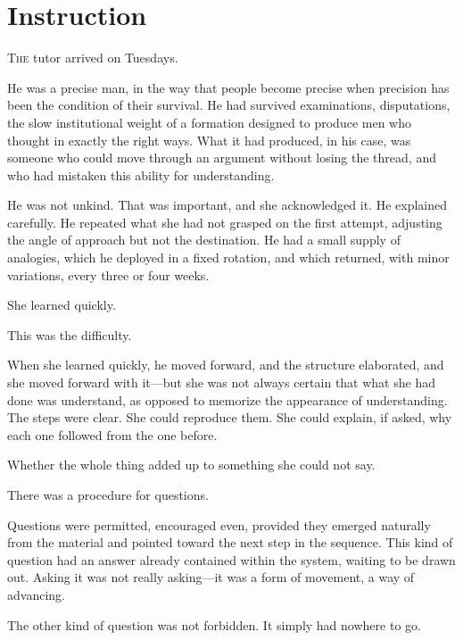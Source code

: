 
\chapter{Instruction}


\lettrine{T}{he} tutor arrived on Tuesdays.

He was a precise man, in the way that people become precise when
precision has been the condition of their survival. He had
survived examinations, disputations, the slow institutional
weight of a formation designed to produce men who thought in
exactly the right ways. What it had produced, in his case, was
someone who could move through an argument without losing the
thread, and who had mistaken this ability for understanding.

He was not unkind. That was important, and she acknowledged it.
He explained carefully. He repeated what she had not grasped on
the first attempt, adjusting the angle of approach but not the
destination. He had a small supply of analogies, which he
deployed in a fixed rotation, and which returned, with minor
variations, every three or four weeks.

She learned quickly.

This was the difficulty.

When she learned quickly, he moved forward, and the structure
elaborated, and she moved forward with it---but she was not
always certain that what she had done was understand, as opposed
to memorize the appearance of understanding. The steps were
clear. She could reproduce them. She could explain, if asked, why
each one followed from the one before.

Whether the whole thing added up to something she could not say.

\scenebreak

There was a procedure for questions.

Questions were permitted, encouraged even, provided they emerged
naturally from the material and pointed toward the next step in
the sequence. This kind of question had an answer already
contained within the system, waiting to be drawn out. Asking it
was not really asking---it was a form of movement, a way of
advancing.

The other kind of question was not forbidden. It simply had
nowhere to go.

